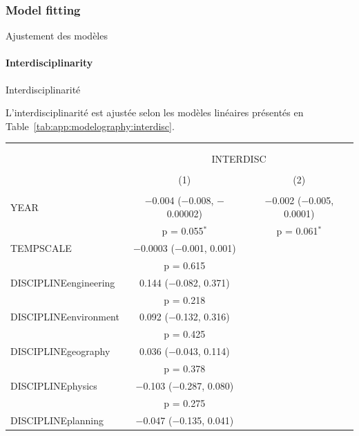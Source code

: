 \subsubsection{Model fitting}{Ajustement des modèles}


\paragraph{Interdisciplinarity}{Interdisciplinarité}


L'interdisciplinarité est ajustée selon les modèles linéaires présentés en Table~\ref{tab:app:modelography:interdisc}.



\begin{table}%
\begin{tabular}{@{\extracolsep{5pt}}lcc} 
\footnotesize
\\[-1.8ex]\hline 
\hline \\[-1.8ex] 
\\[-1.8ex] & \multicolumn{2}{c}{INTERDISC} \\ 
\\[-1.8ex] & (1) & (2)\\ 
\hline \\[-1.8ex] 
 YEAR & $-$0.004 ($-$0.008, $-$0.00002) & $-$0.002 ($-$0.005, 0.0001) \\ 
  & p = 0.055$^{*}$ & p = 0.061$^{*}$ \\ 
  TEMPSCALE & $-$0.0003 ($-$0.001, 0.001) &  \\ 
  & p = 0.615 &  \\ 
  DISCIPLINEengineering & 0.144 ($-$0.082, 0.371) &  \\ 
  & p = 0.218 &  \\ 
  DISCIPLINEenvironment & 0.092 ($-$0.132, 0.316) &  \\ 
  & p = 0.425 &  \\ 
  DISCIPLINEgeography & 0.036 ($-$0.043, 0.114) &  \\ 
  & p = 0.378 &  \\ 
  DISCIPLINEphysics & $-$0.103 ($-$0.287, 0.080) &  \\ 
  & p = 0.275 &  \\ 
  DISCIPLINEplanning & $-$0.047 ($-$0.135, 0.041) &  \\ 

\end{tabular}
\end{table}
